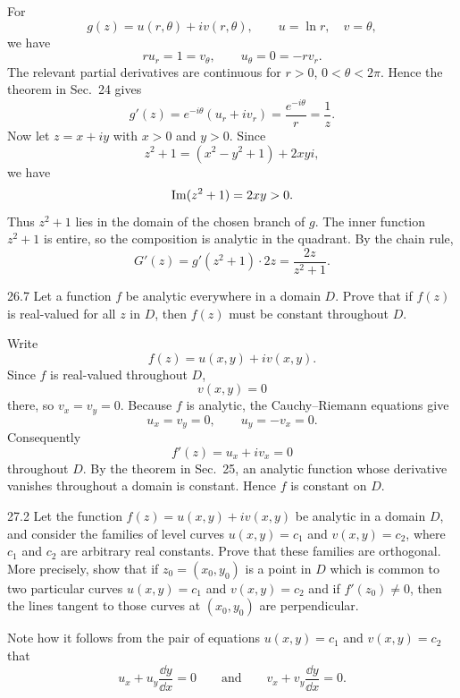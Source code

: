 \documentclass[11pt,oneside]{article}
\begin{document}
\begin{solution}
For
\[
    g(z)=u(r, \theta)+iv(r, \theta),
    \qquad
    u=\ln r, \quad v=\theta,
\]
we have
\[
    r u_r=1=v_\theta,
    \qquad
    u_\theta=0=-r v_r.
\]
The relevant partial derivatives are continuous for \(r>0\), \(0<\theta<2\pi\). Hence the theorem in Sec.~24 gives
\[
    g'(z)=e^{-i\theta}(u_r+i v_r)
    =\frac{e^{-i\theta}}r
    =\boxed{\frac1z}.
\]
Now let \(z=x+iy\) with \(x>0\) and \(y>0\). Since
\[
    z^2+1=(x^2-y^2+1)+2xyi,
\]
we have
\[
    \operatorname{Im}(z^2+1)=2xy>0.
\]
Thus \(z^2+1\) lies in the domain of the chosen branch of \(g\). The inner function \(z^2+1\) is entire, so the composition is analytic in the quadrant. By the chain rule,
\[
    \boxed{G'(z)=g'(z^2+1)\cdot2z=\frac{2z}{z^2+1}}.
\]
\end{solution}

\begin{exercise}{26.7}
Let a function \(f\) be analytic everywhere in a domain \(D\). Prove that if \(f(z)\) is real-valued for all \(z\) in \(D\), then \(f(z)\) must be constant throughout \(D\).
\end{exercise}

\begin{solution}
Write
\[
    f(z)=u(x, y)+iv(x, y).
\]
Since \(f\) is real-valued throughout \(D\),
\[
    v(x, y)=0
\]
there, so \(v_x=v_y=0\). Because \(f\) is analytic, the Cauchy--Riemann equations give
\[
    u_x=v_y=0,
    \qquad
    u_y=-v_x=0.
\]
Consequently
\[
    f'(z)=u_x+i v_x=0
\]
throughout \(D\). By the theorem in Sec.~25, an analytic function whose derivative vanishes throughout a domain is constant. Hence \(f\) is constant on \(D\).
\end{solution}

\begin{exercise}{27.2}
Let the function \(f(z)=u(x, y)+iv(x, y)\) be analytic in a domain \(D\), and consider the families of level curves \(u(x, y)=c_1\) and \(v(x, y)=c_2\), where \(c_1\) and \(c_2\) are arbitrary real constants. Prove that these families are orthogonal. More precisely, show that if \(z_0=(x_0, y_0)\) is a point in \(D\) which is common to two particular curves \(u(x, y)=c_1\) and \(v(x, y)=c_2\) and if \(f'(z_0)\ne0\), then the lines tangent to those curves at \((x_0, y_0)\) are perpendicular.
\begin{suggestion}
Note how it follows from the pair of equations \(u(x, y)=c_1\) and \(v(x, y)=c_2\) that
\[
    u_x+u_y\frac{\dd y}{\dd x}=0
    \qquad\text{and}\qquad
    v_x+v_y\frac{\dd y}{\dd x}=0.
\]
\end{suggestion}
\end{exercise}
\end{document}
